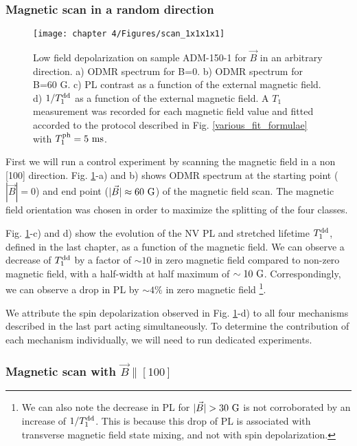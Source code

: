 \documentclass[a4paper, 11pt]{report}
\begin{document}
\subsubsection{Magnetic scan in a random direction}

\begin{figure}[h]
\centering
\texttt{[image: chapter 4/Figures/scan\_1x1x1x1]}
\caption{Low field depolarization on sample ADM-150-1 for $\vec{B}$ in an arbitrary direction. a) ODMR spectrum for B=0. b) ODMR spectrum for B=60 G. c) PL contrast as a function of the external magnetic field. d) $1/T_1^{\rm dd}$ as a function of the external magnetic field. A $T_1$ measurement was recorded for each magnetic field value and fitted accorded to the protocol described in Fig. \ref{various_fit_formulae} with $T_1^{\rm ph}=5\ \rm ms$.}
\label{scan 1x1x1x1}
\end{figure}

First we will run a control experiment by scanning the magnetic field in a non [100] direction. Fig. \ref{scan 1x1x1x1}-a) and b) shows ODMR spectrum at the starting point ($|\vec{B}|=0$) and end point ($|\vec{B}|\approx 60\ \rm G$) of the magnetic field scan. The magnetic field orientation was chosen in order to maximize the splitting of the four classes.

Fig. \ref{scan 1x1x1x1}-c) and d) show the evolution of the NV PL and stretched lifetime $T_1^{\rm dd}$, defined in the last chapter, as a function of the magnetic field. We can observe a decrease of $T_1^{\rm dd}$ by a factor of $\sim 10$ in zero magnetic field compared to non-zero magnetic field, with a half-width at half maximum of $\sim 10\ \rm G$. Correspondingly, we can observe a drop in PL by $\sim 4\%$ in zero magnetic field \footnote{We can also note the decrease in PL for $|\vec{B}|> 30\ \rm G$ is not corroborated by an increase of $1/T_1^{\rm dd}$. This is because this drop of PL is associated with transverse magnetic field state mixing, and not with spin depolarization.}. 

We attribute the spin depolarization observed in Fig. \ref{scan 1x1x1x1}-d) to all four mechanisms described in the last part acting simultaneously. To determine the contribution of each mechanism individually, we will need to run dedicated experiments.

\subsubsection{Magnetic scan with $\vec{B} \parallel [100]$}
\end{document}
